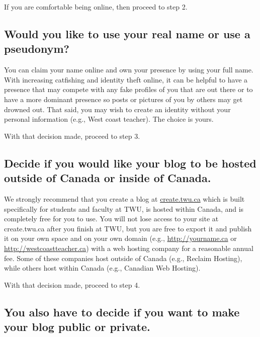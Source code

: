 \documentclass[
]{book}
\begin{document}
If you are comfortable being online, then proceed to step 2.

\hypertarget{would-you-like-to-use-your-real-name-or-use-a-pseudonym}{%
\subsection*{Would you like to use your real name or use a pseudonym?}\label{would-you-like-to-use-your-real-name-or-use-a-pseudonym}}

You can claim your name online and own your presence by using your full name. With increasing catfishing and identity theft online, it can be helpful to have a presence that may compete with any fake profiles of you that are out there or to have a more dominant presence so posts or pictures of you by others may get drowned out. That said, you may wish to create an identity without your personal information (e.g., West coast teacher). The choice is yours.

With that decision made, proceed to step 3.

\hypertarget{decide-if-you-would-like-your-blog-to-be-hosted-outside-of-canada-or-inside-of-canada.}{%
\subsection*{Decide if you would like your blog to be hosted outside of Canada or inside of Canada.}\label{decide-if-you-would-like-your-blog-to-be-hosted-outside-of-canada-or-inside-of-canada.}}

We strongly recommend that you create a blog at \href{https://create.twu.ca}{create.twu.ca} which is built specifically for students and faculty at TWU, is hosted within Canada, and is completely free for you to use. You will not lose access to your site at create.twu.ca after you finish at TWU, but you are free to export it and publish it on your own space and on your own domain (e.g., \url{http://yourname.ca} or \url{http://westcoastteacher.ca}) with a web hosting company for a reasonable annual fee. Some of these companies host outside of Canada (e.g., Reclaim Hosting), while others host within Canada (e.g., Canadian Web Hosting).

With that decision made, proceed to step 4.

\hypertarget{you-also-have-to-decide-if-you-want-to-make-your-blog-public-or-private.}{%
\subsection*{You also have to decide if you want to make your blog public or private.}\label{you-also-have-to-decide-if-you-want-to-make-your-blog-public-or-private.}}
\end{document}
